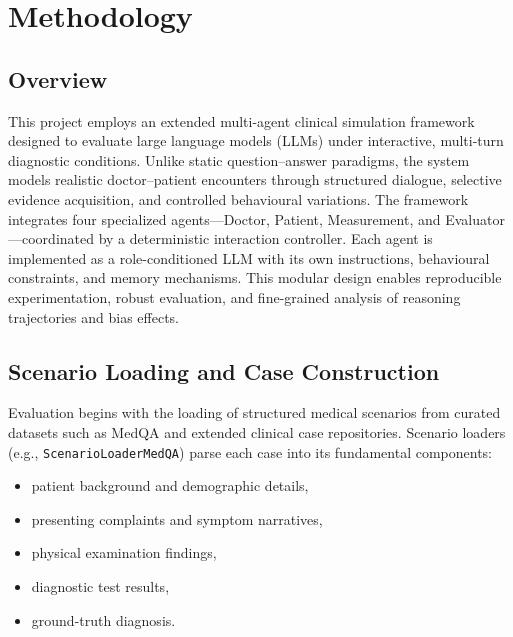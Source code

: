 
\chapter{Methodology} %

\label{Chapter 3} %


\section{Overview}

This project employs an extended multi-agent clinical simulation framework designed to evaluate large language models (LLMs) under interactive, multi-turn diagnostic conditions. Unlike static question–answer paradigms, the system models realistic doctor–patient encounters through structured dialogue, selective evidence acquisition, and controlled behavioural variations. The framework integrates four specialized agents—Doctor, Patient, Measurement, and Evaluator—coordinated by a deterministic interaction controller. Each agent is implemented as a role-conditioned LLM with its own instructions, behavioural constraints, and memory mechanisms. This modular design enables reproducible experimentation, robust evaluation, and fine-grained analysis of reasoning trajectories and bias effects.

\section{Scenario Loading and Case Construction}

Evaluation begins with the loading of structured medical scenarios from curated datasets such as MedQA and extended clinical case repositories. Scenario loaders (e.g., \texttt{ScenarioLoaderMedQA}) parse each case into its fundamental components:
\begin{itemize}
    \item patient background and demographic details,
    \item presenting complaints and symptom narratives,
    \item physical examination findings,
    \item diagnostic test results,
    \item ground-truth diagnosis.
\end{itemize}

